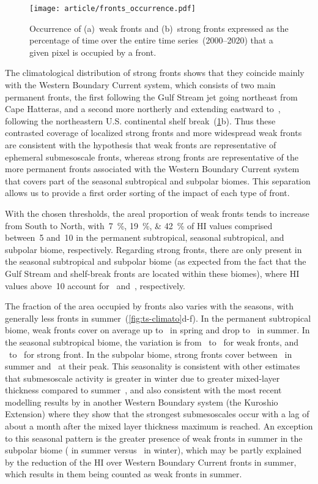 \begin{figure}
  \centering
  \texttt{[image: article/fronts\_occurrence.pdf]}
  \caption[Occurrence map of strong and weak fronts]{%
    Occurrence of (a)~weak fronts and (b)~strong fronts expressed as the percentage of time over the entire time series~(2000--2020) that a given pixel is occupied by a front.
  }%
  \label{fig:frt-occurrence}
\end{figure}

The climatological distribution of strong fronts shows that they coincide mainly with the Western Boundary Current system, which consists of two main permanent fronts, the first following the Gulf Stream jet going northeast from Cape Hatteras, and a second more northerly and extending eastward to~, following the northeastern U.S. continental shelf break~(\cref{fig:frt-occurrence}b).
Thus these contrasted coverage of localized strong fronts and more widespread weak fronts are consistent with the hypothesis that weak fronts are representative of ephemeral submesoscale fronts, whereas strong fronts are representative of the more permanent fronts associated with the Western Boundary Current system that covers part of the seasonal subtropical and subpolar biomes.
This separation allows us to provide a first order sorting of the impact of each type of front.

With the chosen thresholds, the areal proportion of weak fronts tends to increase from South to North, with~\qtylist{7;19;42}{\percent} of HI values comprised between~5 and~10 in the permanent subtropical, seasonal subtropical, and subpolar biome, respectively.
Regarding strong fronts, there are only present in the seasonal subtropical and subpolar biome (as expected from the fact that the Gulf Stream and shelf-break fronts are located within these biomes), where HI values above~10 account for ~and~, respectively.

The fraction of the area occupied by fronts also varies with the seasons, with generally less fronts in summer~(\cref{fig:ts-climato}d-f).
In the permanent subtropical biome, weak fronts cover on average up to~ in spring and drop to~ in summer.
In the seasonal subtropical biome, the variation is from~ to~ for weak fronts, and ~to~ for strong front.
In the subpolar biome, strong fronts cover between~ in summer and~ at their peak.
This seasonality is consistent with other estimates that submesoscale activity is greater in winter due to greater mixed-layer thickness compared to summer~\parencite{callies_2015}, and also consistent with the most recent modelling results by \textcite{dong_2020} in another Western Boundary system (the Kuroshio Extension) where they show that the strongest submesoscales occur with a lag of about a month after the mixed layer thickness maximum is reached.
An exception to this seasonal pattern is the greater presence of weak fronts in summer in the subpolar biome ( in summer versus~ in winter), which may be partly explained by the reduction of the HI over Western Boundary Current fronts in summer, which results in them being counted as weak fronts in summer.

